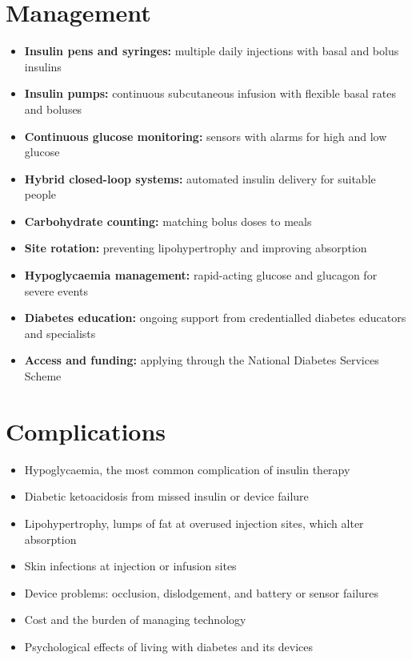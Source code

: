 \section*{Management}
\begin{itemize}
    \item \textbf{Insulin pens and syringes:} multiple daily injections with basal and bolus insulins
    \item \textbf{Insulin pumps:} continuous subcutaneous infusion with flexible basal rates and boluses
    \item \textbf{Continuous glucose monitoring:} sensors with alarms for high and low glucose
    \item \textbf{Hybrid closed-loop systems:} automated insulin delivery for suitable people
    \item \textbf{Carbohydrate counting:} matching bolus doses to meals
    \item \textbf{Site rotation:} preventing lipohypertrophy and improving absorption
    \item \textbf{Hypoglycaemia management:} rapid-acting glucose and glucagon for severe events
    \item \textbf{Diabetes education:} ongoing support from credentialled diabetes educators and specialists
    \item \textbf{Access and funding:} applying through the National Diabetes Services Scheme
\end{itemize}

\section*{Complications}
\begin{itemize}
    \item Hypoglycaemia, the most common complication of insulin therapy
    \item Diabetic ketoacidosis from missed insulin or device failure
    \item Lipohypertrophy, lumps of fat at overused injection sites, which alter absorption
    \item Skin infections at injection or infusion sites
    \item Device problems: occlusion, dislodgement, and battery or sensor failures
    \item Cost and the burden of managing technology
    \item Psychological effects of living with diabetes and its devices
\end{itemize}

